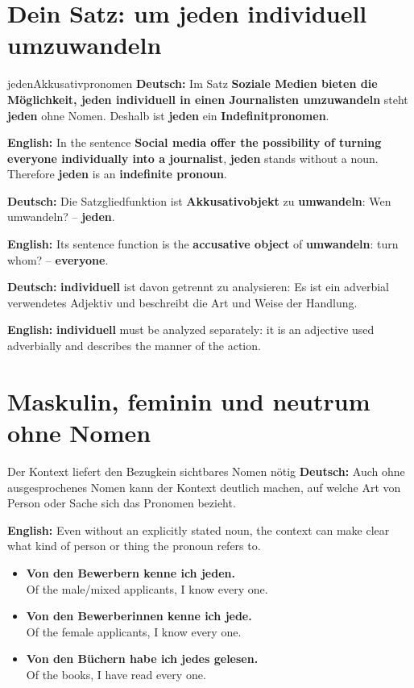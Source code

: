 \documentclass[a4paper,11pt]{article}
\newcommand{\GermanText}[1]{\textbf{Deutsch: }#1\par}
\newcommand{\EnglishText}[1]{{\small\color{SoftGray}\textbf{English: }#1\par}}
\newcommand{\ExampleItem}[2]{\item \textbf{#1}\\{\small\color{SoftGray}#2}}
\begin{document}
\section{Dein Satz: um jeden individuell umzuwandeln}
\begin{grammarentry}{jeden}{Akkusativpronomen}
\GermanText{Im Satz \textbf{Soziale Medien bieten die Möglichkeit, jeden individuell in einen Journalisten umzuwandeln} steht \textbf{jeden} ohne Nomen. Deshalb ist \textbf{jeden} ein \textbf{Indefinitpronomen}.}
\EnglishText{In the sentence \textbf{Social media offer the possibility of turning everyone individually into a journalist}, \textbf{jeden} stands without a noun. Therefore \textbf{jeden} is an \textbf{indefinite pronoun}.}
\GermanText{Die Satzgliedfunktion ist \textbf{Akkusativobjekt} zu \textbf{umwandeln}: Wen umwandeln? -- \textbf{jeden}.}
\EnglishText{Its sentence function is the \textbf{accusative object} of \textbf{umwandeln}: turn whom? -- \textbf{everyone}.}
\GermanText{\textbf{individuell} ist davon getrennt zu analysieren: Es ist ein adverbial verwendetes Adjektiv und beschreibt die Art und Weise der Handlung.}
\EnglishText{\textbf{individuell} must be analyzed separately: it is an adjective used adverbially and describes the manner of the action.}
\end{grammarentry}

\section{Maskulin, feminin und neutrum ohne Nomen}
\begin{grammarentry}{Der Kontext liefert den Bezug}{kein sichtbares Nomen nötig}
\GermanText{Auch ohne ausgesprochenes Nomen kann der Kontext deutlich machen, auf welche Art von Person oder Sache sich das Pronomen bezieht.}
\EnglishText{Even without an explicitly stated noun, the context can make clear what kind of person or thing the pronoun refers to.}
\end{grammarentry}

\begin{exbox}
\begin{itemize}
\ExampleItem{Von den Bewerbern kenne ich jeden.}{Of the male/mixed applicants, I know every one.}
\ExampleItem{Von den Bewerberinnen kenne ich jede.}{Of the female applicants, I know every one.}
\ExampleItem{Von den Büchern habe ich jedes gelesen.}{Of the books, I have read every one.}
\end{itemize}
\end{exbox}
\end{document}

